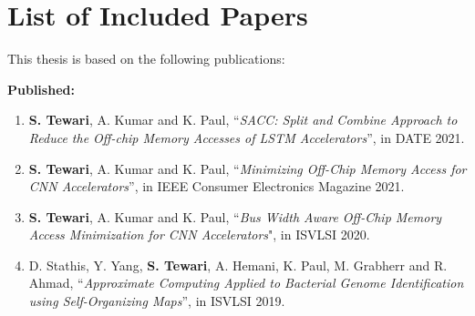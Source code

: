 \section*{List of Included Papers}
This thesis is based on the following publications:

\textbf{Published:}


\begin{enumerate}
\item \textbf{S. Tewari}, A. Kumar and K. Paul, ``\textit{SACC: Split and Combine Approach to Reduce the Off-chip Memory Accesses of LSTM Accelerators}'', in DATE 2021.

\item \textbf{S. Tewari}, A. Kumar and K. Paul, ``\textit{Minimizing Off-Chip Memory Access for CNN Accelerators}'', in IEEE Consumer Electronics Magazine 2021.

\item \textbf{S. Tewari}, A. Kumar and K. Paul, ``\textit{Bus Width Aware Off-Chip Memory Access Minimization for CNN Accelerators}", in ISVLSI 2020.

\item D. Stathis, Y. Yang, \textbf{S. Tewari}, A. Hemani, K. Paul, M. Grabherr and R. Ahmad, ``\textit{Approximate Computing Applied to Bacterial Genome Identification using Self-Organizing Maps}'', in ISVLSI 2019.

\setcounter{saveenum}{\value{enumi}}
\end{enumerate}



%
%
%
%



